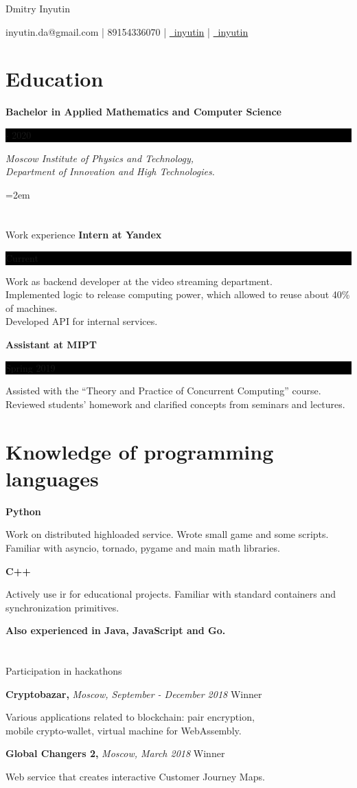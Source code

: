 \documentclass[fontsize=11pt]{article}
\newcommand{\sepspace}{\vspace*{1em}}   %
\newcommand{\MyName}[1]{ %
    \Huge \centering #1
    \par \normalsize \normalfont}
\newcommand{\NewPart}[1]{\section*{#1}}
\newcommand{\ProgrammingEntry}[2]{
    \noindent \textbf{#1} \hfill      %

    \noindent \small #2 %
    \normalsize \par}
\newcommand{\EducationEntry}[4]{
    \noindent \textbf{#1} \hfill      %
    \colorbox{Black}{
      \parbox{10em}{
      \color{White} \centering #2}} \par   %
    \noindent \textit{#3} \par        %
    \noindent\hangindent=2em\hangafter=0 \small #4 %
    \normalsize \par}
\newcommand{\WorkEntry}[3]{       %
    \noindent \large \textbf{#1} \hfill      %
    \colorbox{Black}{%
      \parbox{10em}{%
      \color{White} \centering #2}} \par  %
    \noindent \small #3 %
    \normalsize \par}
\newcommand{\AwardEntry}[4]{         %
    \noindent \textbf{#1} \noindent \textit{#3} \hfill {#2} \par
    \noindent \small #4 %
    \normalsize \par}
\begin{document}
\begin{minipage}{17cm}\raggedright
\MyName{Dmitry Inyutin}
{inyutin.da@gmail.com | 89154336070 | \href{https://t.me/inyutin}{\faTelegram \, inyutin} | \href{https://github.com/inyutin}{\faGithub \, inyutin}}
\end{minipage}



\NewPart{Education}{}
\EducationEntry
{Bachelor in Applied Mathematics and Computer Science}
{2016 - 2020}
{Moscow Institute of Physics and Technology, \\
 Department of Innovation and High Technologies.}

\NewPart{Work experience}{}
\WorkEntry
{Intern at Yandex}
{Current}
{Work as backend developer at the video streaming department.\\  Implemented logic to release computing power, which allowed to reuse about 40\% of machines. \\ Developed API for internal services. }

\bigskip

\WorkEntry
{Assistant at MIPT}
{Spring 2019}
{Assisted with the “Theory and Practice of Concurrent Computing” course. \\
 Reviewed students’ homework and clarified concepts from seminars and lectures.}

\NewPart{Knowledge of programming languages}{}
\ProgrammingEntry
{\textbf Python}
{Work on distributed highloaded service.
Wrote small game and some scripts. \\ Familiar with asyncio, tornado, pygame and main math libraries.}
\bigskip
\ProgrammingEntry
{C++}
{Actively use ir for educational projects. Familiar with standard containers and synchronization primitives.}
\bigskip

\ProgrammingEntry
{Also experienced in Java, JavaScript and Go.}

\NewPart{Participation in hackathons}{}

\AwardEntry{Cryptobazar, }{Winner}
{Moscow, September - December 2018}
{Various applications related to blockchain: pair encryption, \\ mobile crypto-wallet, virtual machine for WebAssembly.}
\sepspace
\AwardEntry{Global Changers 2,}{Winner}
{Moscow, March 2018}
{Web service that creates interactive Customer Journey Maps.}
\end{document}
